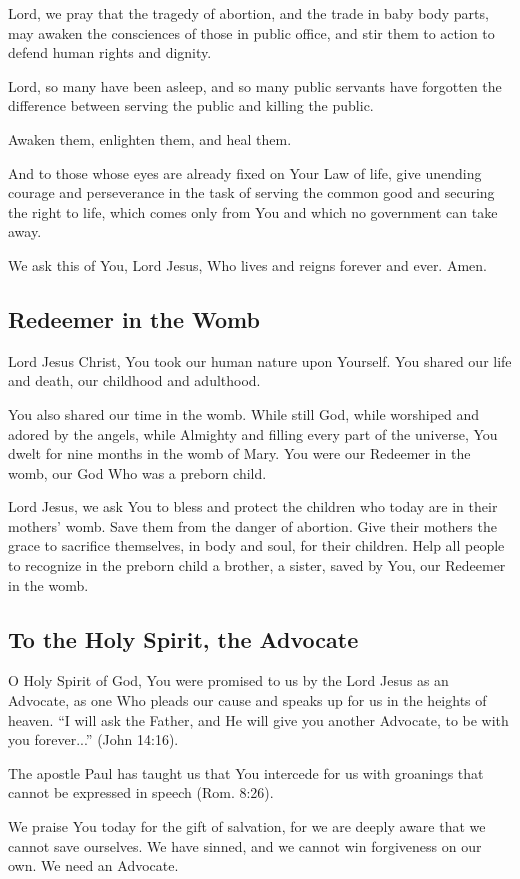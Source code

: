 \documentclass[12pt]{article}
\newcommand{\prayertitle}[1]{\subsection{#1}}
\begin{document}
Lord, we pray that the tragedy of abortion, and the trade in baby body parts, may awaken the consciences of those in public office, and stir them to action to defend human rights and dignity.

Lord, so many have been asleep, and so many public servants have forgotten the difference between serving the public and killing the public.

Awaken them, enlighten them, and heal them.

And to those whose eyes are already fixed on Your Law of life, give unending courage and perseverance in the task of serving the common good and securing the right to life, which comes only from You and which no government can take away.

We ask this of You, Lord Jesus, Who lives and reigns forever and ever. Amen.

\prayertitle{Redeemer in the Womb}
Lord Jesus Christ, You took our human nature upon Yourself.
You shared our life and death, our childhood and adulthood.

You also shared our time in the womb. While still God, while worshiped and adored by the angels, while Almighty and filling every part of the universe, You dwelt for nine months in the womb of Mary.
You were our Redeemer in the womb, our God Who was a preborn child.

Lord Jesus, we ask You to bless and protect the children who today are in their mothers' womb.
Save them from the danger of abortion.
Give their mothers the grace to sacrifice themselves, in body and soul, for their children.
Help all people to recognize in the preborn child a brother, a sister, saved by You, our Redeemer in the womb.

\prayertitle{To the Holy Spirit, the Advocate}
O Holy Spirit of God, You were promised to us by the Lord Jesus as an Advocate, as one Who pleads our cause and speaks up for us in the heights of heaven.
``I will ask the Father, and He will give you another Advocate, to be with you forever...'' (John 14:16).

The apostle Paul has taught us that You intercede for us with groanings that cannot be expressed in speech (Rom. 8:26).

We praise You today for the gift of salvation, for we are deeply aware that we cannot save ourselves.
We have sinned, and we cannot win forgiveness on our own.
We need an Advocate.
\end{document}
